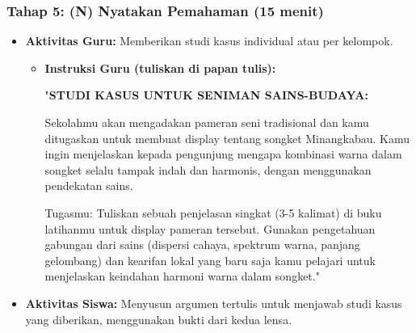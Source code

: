 \documentclass[12pt,a4paper]{article}
\begin{document}
\subsubsection{Tahap 5: (N) Nyatakan Pemahaman (15 menit)}
\begin{itemize}
\item \textbf{Aktivitas Guru:} Memberikan studi kasus individual atau per kelompok.
    \begin{itemize}
    \item \textbf{Instruksi Guru (tuliskan di papan tulis):}
    
    "\textbf{STUDI KASUS UNTUK SENIMAN SAINS-BUDAYA:}
    
    Sekolahmu akan mengadakan pameran seni tradisional dan kamu ditugaskan untuk membuat display tentang songket Minangkabau. Kamu ingin menjelaskan kepada pengunjung mengapa kombinasi warna dalam songket selalu tampak indah dan harmonis, dengan menggunakan pendekatan sains.
    
    Tugasmu: Tuliskan sebuah penjelasan singkat (3-5 kalimat) di buku latihanmu untuk display pameran tersebut. Gunakan pengetahuan gabungan dari sains (dispersi cahaya, spektrum warna, panjang gelombang) dan kearifan lokal yang baru saja kamu pelajari untuk menjelaskan keindahan harmoni warna dalam songket."
    \end{itemize}
\item \textbf{Aktivitas Siswa:} Menyusun argumen tertulis untuk menjawab studi kasus yang diberikan, menggunakan bukti dari kedua lensa.
\end{itemize}
\end{document}

